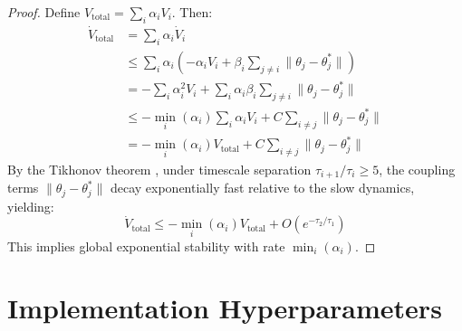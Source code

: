 \documentclass[12pt,a4paper,twocolumn]{article}
\begin{document}
\begin{enumerate}[leftmargin=*]
\begin{proof}
Define $V_{\text{total}} = \sum_i \alpha_i V_i$. Then:
\begin{align}
    \dot{V}_{\text{total}} &= \sum_i \alpha_i \dot{V}_i \\
    &\leq \sum_i \alpha_i \left(-\alpha_i V_i + \beta_i \sum_{j \neq i} \|\theta_j - \theta_j^*\|\right) \\
    &= -\sum_i \alpha_i^2 V_i + \sum_i \alpha_i \beta_i \sum_{j \neq i} \|\theta_j - \theta_j^*\| \\
    &\leq -\min_i(\alpha_i) \sum_i \alpha_i V_i + C\sum_{i \neq j} \|\theta_j - \theta_j^*\| \\
    &= -\min_i(\alpha_i) V_{\text{total}} + C\sum_{i \neq j} \|\theta_j - \theta_j^*\|
\end{align}
By the Tikhonov theorem \citep{Khalil2002}, under timescale separation $\tau_{i+1}/\tau_i \geq 5$, the coupling terms $\|\theta_j - \theta_j^*\|$ decay exponentially fast relative to the slow dynamics, yielding:
\begin{equation}
    \dot{V}_{\text{total}} \leq -\min_i(\alpha_i) V_{\text{total}} + O(e^{-\tau_2/\tau_1})
\end{equation}
This implies global exponential stability with rate $\min_i(\alpha_i)$.
\end{proof}

\section{Implementation Hyperparameters}
\label{app:hyperparameters}


\end{enumerate}
\end{document}
